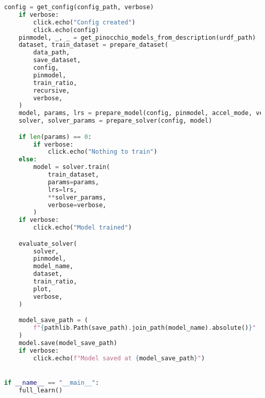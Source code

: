 \begin{lstlisting}[language=python, caption=\raggedright{identification/full.py}, frame=single]
    config = get_config(config_path, verbose)
    if verbose:
        click.echo("Config created")
        click.echo(config)
    pinmodel, _, _ = get_pinocchio_models_from_description(urdf_path)
    dataset, train_dataset = prepare_dataset(
        data_path,
        save_dataset,
        config,
        pinmodel,
        train_ratio,
        recursive,
        verbose,
    )
    model, params, lrs = prepare_model(config, pinmodel, accel_mode, verbose)
    solver, solver_params = prepare_solver(config, model)

    if len(params) == 0:
        if verbose:
            click.echo("Nothing to train")
    else:
        model = solver.train(
            train_dataset,
            params=params,
            lrs=lrs,
            **solver_params,
            verbose=verbose,
        )
    if verbose:
        click.echo("Model trained")

    evaluate_solver(
        solver,
        pinmodel,
        model_name,
        dataset,
        train_ratio,
        plot,
        verbose,
    )

    model_save_path = (
        f"{pathlib.Path(save_path).join_path(model_name).absolute()}"
    )
    model.save(model_save_path)
    if verbose:
        click.echo(f"Model saved at {model_save_path}")


if __name__ == "__main__":
    full_learn()

\end{lstlisting}